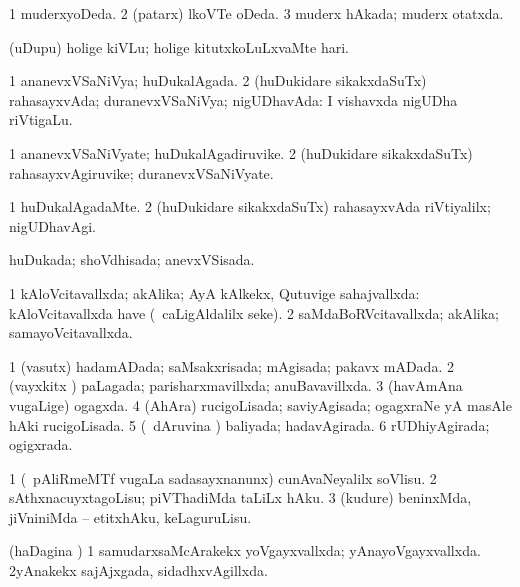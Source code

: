 {{\bentry
{} 
\gl{\gu}
\expl{}
\bmng
\bnum
\num{1} muderxyoDeda. 
\num{2} (patarx) lkoVTe oDeda. 
\num{3} muderx hAkada; muderx otatxda. 
\enum
\emng
\eentry

\bentry
{} 
\gl{\akirx}
\expl{}
\bmng
(uDupu) holige kiVLu; holige kitutxkoLuLxvaMte hari. 
\emng
\eentry

\bentry
{} 
\gl{\gu}
\expl{}
\bmng
\bnum
\num{1} ananevxVSaNiVya; huDukalAgada. 
\num{2} (huDukidare sikakxdaSuTx) rahasayxvAda; duranevxVSaNiVya; nigUDhavAda:  I vishavxda nigUDha riVtigaLu. 
\enum
\emng
\eentry

\bentry
{} 
\gl{\nA}
\expl{}
\bmng
\bnum
\num{1} ananevxVSaNiVyate; huDukalAgadiruvike. 
\num{2} (huDukidare sikakxdaSuTx) rahasayxvAgiruvike; duranevxVSaNiVyate. 
\enum
\emng
\eentry

\bentry
{} 
\gl{\kirxvi}
\expl{}
\bmng
\bnum
\num{1} huDukalAgadaMte. 
\num{2} (huDukidare sikakxdaSuTx) rahasayxvAda riVtiyalilx; nigUDhavAgi. 
\enum
\emng
\eentry

\bentry
{} 
\gl{\gu}
\expl{}
\bmng
huDukada; shoVdhisada; anevxVSisada. 
\emng
\eentry

\bentry
{} 
\gl{\gu}
\expl{}
\bmng
\bnum
\num{1} kAloVcitavallxda; akAlika; AyA kAlkekx, Qutuvige sahajvallxda:  kAloVcitavallxda have (\udA\ caLigAldalilx seke). 
\num{2} saMdaBoRVcitavallxda; akAlika; samayoVcitavallxda. 
\enum
\emng
\eentry

\bentry
{} 
\gl{\gu}
\expl{}
\bmng
\bnum
\num{1} (vasutx) hadamADada; saMsakxrisada; mAgisada; pakavx mADada. 
\num{2} (vayxkitx ) paLagada; parisharxmavillxda; anuBavavillxda. 
\num{3} (havAmAna \mo vugaLige) ogagxda. 
\num{4} (AhAra) rucigoLisada; saviyAgisada; ogagxraNe yA masAle hAki rucigoLisada. 
\num{5} (\kanmu\ dAruvina \vi) baliyada; hadavAgirada. 
\num{6} rUDhiyAgirada; ogigxrada. 
\enum
\emng
\eentry

\bentry
{} 
\gl{\sakirx}
\expl{}
\bmng
\bnum
\num{1} (\kanmu\ pAliRmeMTf \mo vugaLa sadasayxnanunx) cunAvaNeyalilx soVlisu. 
\num{2} sAthxnacuyxtagoLisu; piVThadiMda taLiLx hAku. 
\num{3} (kudure) beninxMda, jiVniniMda -- etitxhAku, keLaguruLisu. 
\enum
\emng
\eentry

\bentry
{} 
\gl{\gu}
\expl{}
\bmng
(haDagina \vi) 
\bnum
\num{1} samudarxsaMcArakekx yoVgayxvallxda; yAnayoVgayxvallxda. 
\num{2}yAnakekx sajAjxgada, sidadhxvAgillxda. 
\enum
\emng
\eentry

}}
